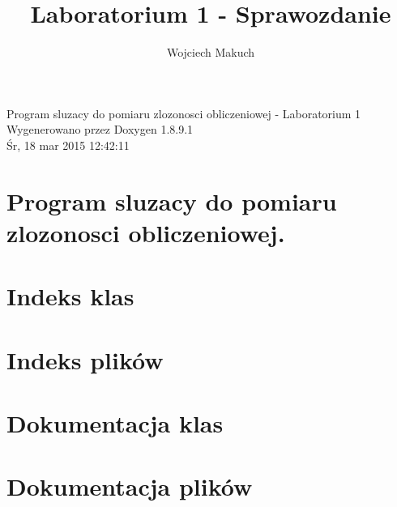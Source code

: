 \documentclass[twoside]{article}
\newcommand{\+}{\discretionary{\mbox{\scriptsize$\hookleftarrow$}}{}{}}
\begin{document}
\hypersetup{pageanchor=false,
             bookmarks=true,
             bookmarksnumbered=true,
             pdfencoding=unicode
            }
\begin{titlepage}
\vspace*{7cm}
\begin{center}%
{\Large Program sluzacy do pomiaru zlozonosci obliczeniowej -\/ Laboratorium 1 }\\
\vspace*{1cm}
{\large Wygenerowano przez Doxygen 1.8.9.1}\\
\vspace*{0.5cm}
{\small Śr, 18 mar 2015 12:42:11}\\
\end{center}
\end{titlepage}
\tableofcontents
{}
\hypersetup{pageanchor=true}

\section{Program sluzacy do pomiaru zlozonosci obliczeniowej.}
\label{index}\hypertarget{index}{}
\section{Indeks klas}

\section{Indeks plików}

\section{Dokumentacja klas}

\section{Dokumentacja plików}





\author{Wojciech Makuch}
\title{Laboratorium 1 - Sprawozdanie}
\end{document}
